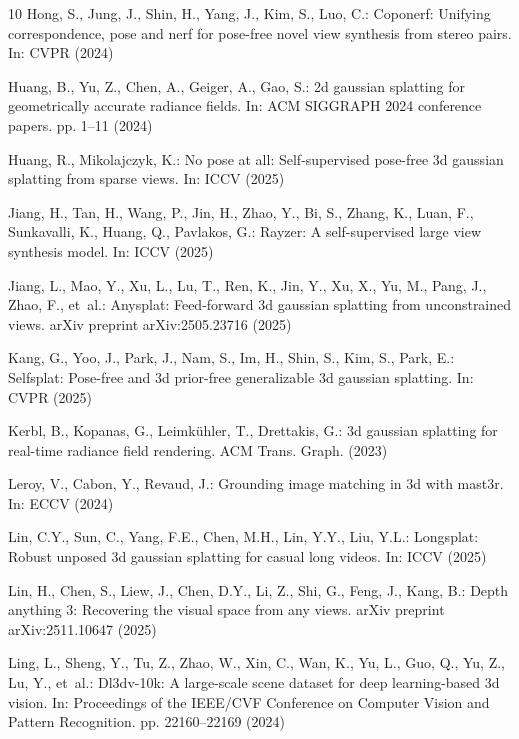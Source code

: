 \documentclass[runningheads]{llncs}
\begin{document}
\begin{thebibliography}{10}
Hong, S., Jung, J., Shin, H., Yang, J., Kim, S., Luo, C.: Coponerf: Unifying correspondence, pose and nerf for pose-free novel view synthesis from stereo pairs. In: CVPR (2024)

Huang, B., Yu, Z., Chen, A., Geiger, A., Gao, S.: 2d gaussian splatting for geometrically accurate radiance fields. In: ACM SIGGRAPH 2024 conference papers. pp. 1--11 (2024)

Huang, R., Mikolajczyk, K.: No pose at all: Self-supervised pose-free 3d gaussian splatting from sparse views. In: ICCV (2025)

Jiang, H., Tan, H., Wang, P., Jin, H., Zhao, Y., Bi, S., Zhang, K., Luan, F., Sunkavalli, K., Huang, Q., Pavlakos, G.: Rayzer: A self-supervised large view synthesis model. In: ICCV (2025)

Jiang, L., Mao, Y., Xu, L., Lu, T., Ren, K., Jin, Y., Xu, X., Yu, M., Pang, J., Zhao, F., et~al.: Anysplat: Feed-forward 3d gaussian splatting from unconstrained views. arXiv preprint arXiv:2505.23716  (2025)

Kang, G., Yoo, J., Park, J., Nam, S., Im, H., Shin, S., Kim, S., Park, E.: Selfsplat: Pose-free and 3d prior-free generalizable 3d gaussian splatting. In: CVPR (2025)

Kerbl, B., Kopanas, G., Leimk{\"u}hler, T., Drettakis, G.: 3d gaussian splatting for real-time radiance field rendering. ACM Trans. Graph.  (2023)

Leroy, V., Cabon, Y., Revaud, J.: Grounding image matching in 3d with mast3r. In: ECCV (2024)

Lin, C.Y., Sun, C., Yang, F.E., Chen, M.H., Lin, Y.Y., Liu, Y.L.: Longsplat: Robust unposed 3d gaussian splatting for casual long videos. In: ICCV (2025)

Lin, H., Chen, S., Liew, J., Chen, D.Y., Li, Z., Shi, G., Feng, J., Kang, B.: Depth anything 3: Recovering the visual space from any views. arXiv preprint arXiv:2511.10647  (2025)

Ling, L., Sheng, Y., Tu, Z., Zhao, W., Xin, C., Wan, K., Yu, L., Guo, Q., Yu, Z., Lu, Y., et~al.: Dl3dv-10k: A large-scale scene dataset for deep learning-based 3d vision. In: Proceedings of the IEEE/CVF Conference on Computer Vision and Pattern Recognition. pp. 22160--22169 (2024)


\end{thebibliography}
\end{document}
